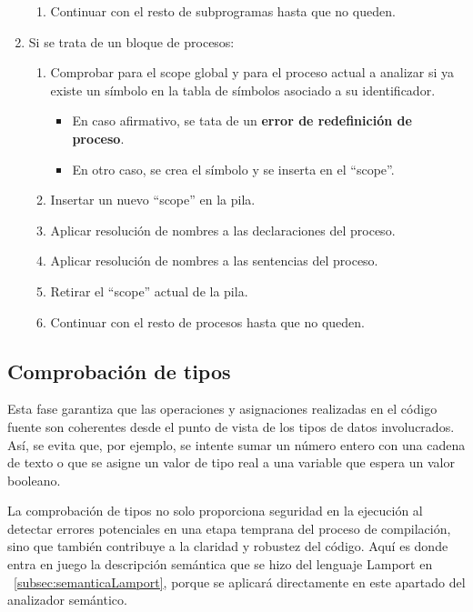 \begin{enumerate}
\begin{enumerate}
        \item Continuar con el resto de subprogramas hasta que no queden.
    \end{enumerate}
    \item Si se trata de un bloque de procesos:
    \begin{enumerate}
        \item Comprobar para el scope global y para el proceso actual a analizar si ya existe un símbolo en la tabla de símbolos asociado a su identificador.
        \begin{itemize}
            \item En caso afirmativo, se tata de un \textbf{error de redefinición de proceso}.
            \item En otro caso, se crea el símbolo y se inserta en el ``scope''.
        \end{itemize}
        \item Insertar un nuevo ``scope'' en la pila.
        \item Aplicar resolución de nombres a las declaraciones del proceso.
        \item Aplicar resolución de nombres a las sentencias del proceso.
        \item Retirar el ``scope'' actual de la pila.

        \item Continuar con el resto de procesos hasta que no queden.
    \end{enumerate}
\end{enumerate}

\subsection{Comprobación de tipos}
Esta fase garantiza que las operaciones y asignaciones realizadas en el código fuente son coherentes desde el punto de vista de los tipos de datos involucrados. Así, se evita que, por ejemplo, se intente sumar un número entero con una cadena de texto o que se asigne un valor de tipo real a una variable que espera un valor booleano.



La comprobación de tipos no solo proporciona seguridad en la ejecución al detectar errores potenciales en una etapa temprana del proceso de compilación, sino que también contribuye a la claridad y robustez del código. Aquí es donde entra en juego la descripción semántica que se hizo del lenguaje Lamport en ~\ref{subsec:semanticaLamport}, porque se aplicará directamente en este apartado del analizador semántico.



